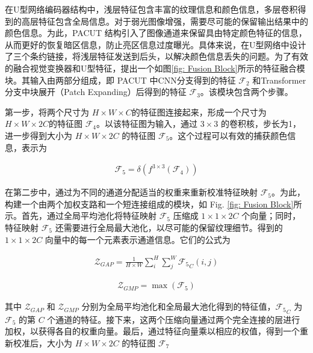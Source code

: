 \documentclass[a4paper]{ctexart}
\begin{document}
在U型网络编码器结构中，浅层特征包含丰富的纹理信息和颜色信息，多层卷积得到的高层特征包含全局信息。对于弱光图像增强，需要尽可能的保留输出结果中的颜色信息。为此，PACUT 结构引入了图像通道来保留具由特定颜色特征的信息，从而更好的恢复暗区信息，防止亮区信息过度曝光。具体来说，在U型网络中设计了三个条约链接，将浅层特征发送到后头，以解决颜色信息丢失的问题。为了有效的融合视觉变换器和U型特征，提出一个如图\ref{fig: Fusion Block}所示的特征融合模块。其输入由两部分组成，即 PACUT 中CNN分支得到的特征 $\mathcal{F}_2$ 和Transformer分支中块展开（Patch Expanding）后得到的特征 $\mathcal{F}_3$。该模块包含两个步骤。
	
第一步，将两个尺寸为 $H \times W \times C$的特征图连接起来，形成一个尺寸为 $H \times W \times 2C$的特征图 $\mathcal{F}_4$。以该特征图为输入，通过 $3 \times 3$ 的卷积核，步长为1，进一步得到大小为 $H \times W \times 2C$ 的特征图 $\mathcal{F}_5$。这个过程可以有效的捕获颜色信息，表示为 
	
\begin{equation}
	\begin{aligned}
		\mathcal{F}_5 = \delta \left( f^{3 \times 3} (\mathcal{F}_4)\right)
	\end{aligned}
	\label{eq: capture color information}
\end{equation}
	
在第二步中，通过为不同的通道分配适当的权重来重新校准特征映射 $\mathcal{F}_5$。为此，构建一个由两个加权支路和一个短连接组成的模块，如 Fig. \ref{fig: Fusion Block}所示。首先，通过全局平均池化将特征映射 $\mathcal{F}_5$ 压缩成 $1 \times 1 \times 2C$ 个向量；同时，特征映射 $\mathcal{F}_5$ 还需要进行全局最大池化，以尽可能的保留纹理细节。得到的 $1 \times 1 \times 2C$ 向量中的每一个元素表示通道信息。它们的公式为
	
\begin{equation}
	\begin{aligned}
		\mathcal{Z}_{GAP} = \frac{1}{H \times W} \sum_{i}^{H} \sum_{j}^{W} {\mathcal{F}_5}_C (i,j)
	\end{aligned}
	\label{eq: avgpool}
\end{equation}
	
\begin{equation}
	\begin{aligned}
		\mathcal{Z}_{GMP} = \max \left( \mathcal{F}_5 \right)
	\end{aligned}
	\label{eq: maxpool}
\end{equation}
	
其中 $\mathcal{Z}_{GAP}$ 和 $\mathcal{Z}_{GMP}$ 分别为全局平均池化和全局最大池化得到的特征值，${\mathcal{F}_5}_C$ 为 $\mathcal{F}_5$ 的第 $C$ 个通道的特征。接下来，这两个压缩向量通过两个完全连接的层进行加权，以获得各自的权重向量。最后，通过特征向量乘以相应的权值，得到一个重新校准后，大小为 $H \times W \times 2C$ 的特征图 $\mathcal{F}_7$
	
\end{document}

